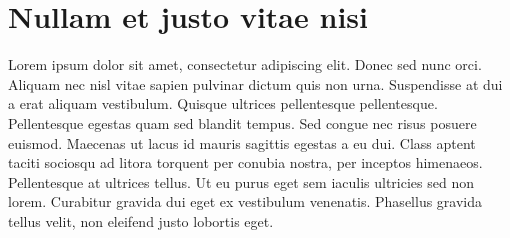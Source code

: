 \section{Nullam et justo vitae nisi}
\label{sec:problem}

Lorem ipsum dolor sit amet, consectetur adipiscing elit. Donec sed nunc orci. Aliquam nec nisl vitae sapien pulvinar dictum quis non urna. Suspendisse at dui a erat aliquam vestibulum. Quisque ultrices pellentesque pellentesque. Pellentesque egestas quam sed blandit tempus. Sed congue nec risus posuere euismod. Maecenas ut lacus id mauris sagittis egestas a eu dui. Class aptent taciti sociosqu ad litora torquent per conubia nostra, per inceptos himenaeos. Pellentesque at ultrices tellus. Ut eu purus eget sem iaculis ultricies sed non lorem. Curabitur gravida dui eget ex vestibulum venenatis. Phasellus gravida tellus velit, non eleifend justo lobortis eget.
